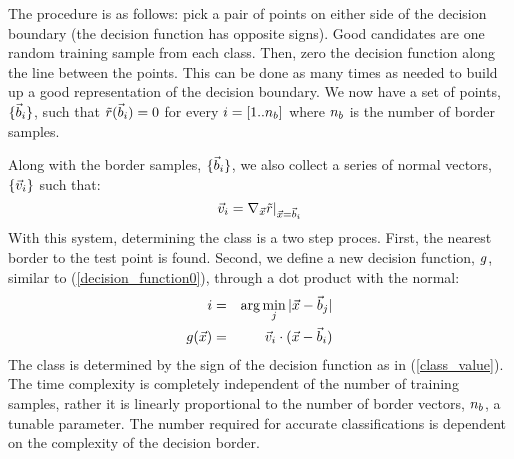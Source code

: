 \documentclass{article}
\begin{document}
The procedure is as follows: pick a pair of points on either side of the decision
boundary (the decision function has opposite signs). Good candidates are one
random training sample from each class. Then, zero the decision function
along the line between the points. This can be done as many times as needed
to build up a good representation of the decision boundary.
We now have a set of points, $\lbrace \vec b_i \rbrace$, such that
$\tilde r(\vec b_i)=0$ for every $i=[1..n_b]$ where
$n_b$ is the number of border samples.

Along with the border samples,  $\lbrace \vec b_i \rbrace$, we also
collect a series of normal vectors, $\lbrace \vec v_i \rbrace$
such that:
\begin{equation}
\vec v_i=\nabla_{\vec {x}}{\tilde r |_{\vec {x}=\vec b_i}}
\end{equation}
With this system, determining the class is a two step proces.
First, the nearest border to the test point is found.
Second, we define a new decision function, $g$, 
similar to (\ref{decision_function0}), through a dot product with the normal:
\begin{eqnarray}
	i & = & \arg \min_j |\vec {x} - \vec b_j| \\ \nonumber
	g(\vec {x}) & = & \vec v_i \cdot (\vec {x} - \vec b_i)
	\label{border_decision}
\end{eqnarray}
The class is determined by the sign of the decision function as in 
(\ref{class_value}).
The time complexity is completely independent of the number
of training samples, rather it is linearly proportional to the number of
border vectors, $n_b$, a tunable parameter. The number required for
accurate classifications is dependent on the complexity of the decision
border.
\end{document}
